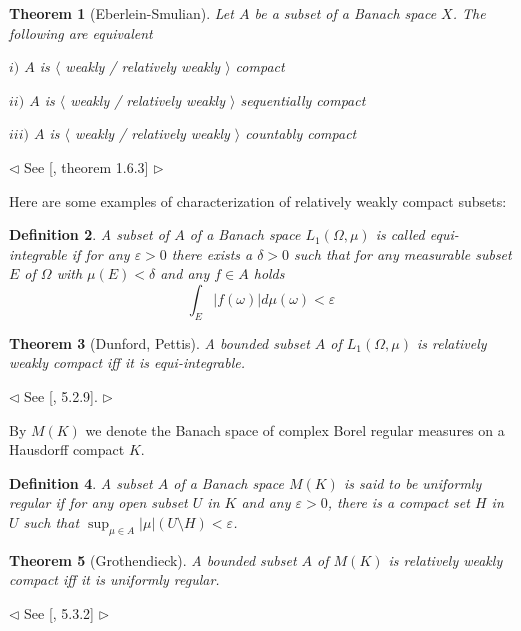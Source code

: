 \documentclass[12pt]{article}
\newtheorem{theorem}{Theorem}
\newtheorem{definition}[theorem]{Definition}
\newenvironment{proof}{\par $\triangleleft$}{$\triangleright$}
\begin{document}
\begin{theorem}[Eberlein-Smulian] Let $A$ be a subset of a Banach space $X$. The following are equivalent

$i)$ $A$ is $\langle$ weakly / relatively weakly $\rangle$ compact

$ii)$ $A$ is $\langle$ weakly / relatively weakly $\rangle$ sequentially compact

$iii)$ $A$ is $\langle$ weakly / relatively weakly $\rangle$ countably compact
\end{theorem}
\begin{proof} See [\cite{KalAlbTopicsBanSpTh}, theorem 1.6.3]
\end{proof}

Here are some examples of characterization of relatively weakly compact subsets:

\begin{definition} A subset of $A$ of a Banach space $L_1(\Omega,\mu)$ is called equi-integrable if for any $\varepsilon>0$ there exists a $\delta>0$ such that for any measurable subset $E$ of $\Omega$ with $\mu(E)<\delta$ and any $f\in A$ holds
$$
\int_E |f(\omega)|d\mu(\omega)<\varepsilon
$$
\end{definition}

\begin{theorem}[Dunford, Pettis] A bounded subset $A$ of $L_1(\Omega,\mu)$ is relatively weakly compact iff it is equi-integrable.
\end{theorem}
\begin{proof} See [\cite{KalAlbTopicsBanSpTh}, 5.2.9].
\end{proof}

By $M(K)$ we denote the Banach space of complex Borel regular measures on a Hausdorff compact $K$.

\begin{definition} A subset $A$ of a Banach space $M(K)$ is said to be uniformly regular if for any open subset $U$ in $K$ and any $\varepsilon>0$, there is a compact set $H$ in $U$ such that $\sup_{\mu\in A}|\mu|(U\setminus H)<\varepsilon$.
\end{definition}

\begin{theorem}[Grothendieck] A bounded subset $A$ of $M(K)$ is relatively weakly compact iff it is uniformly regular.
\end{theorem}
\begin{proof} See [\cite{KalAlbTopicsBanSpTh}, 5.3.2]
\end{proof}
\end{document}
